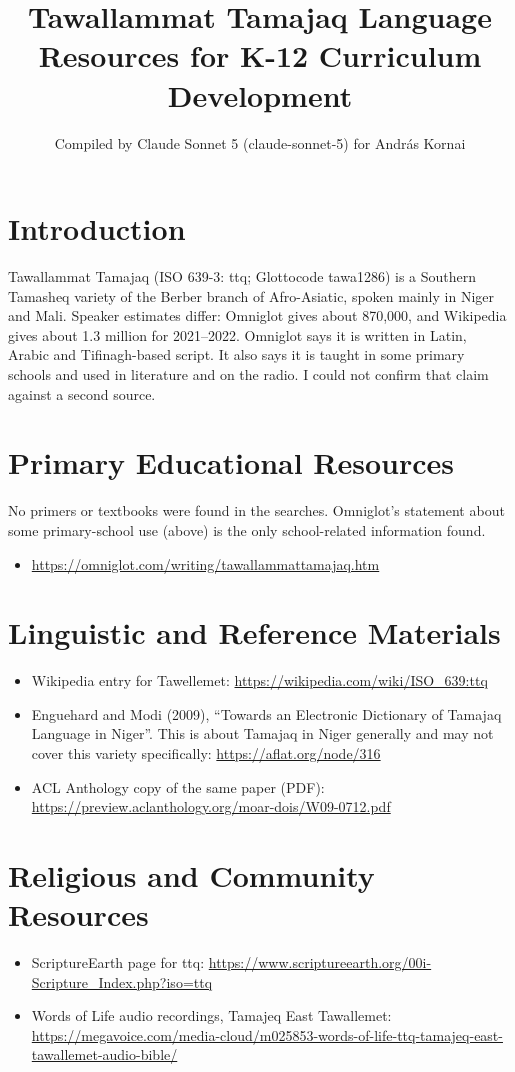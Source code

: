 \documentclass[12pt]{article}
\title{Tawallammat Tamajaq Language Resources for K-12 Curriculum Development}
\author{Compiled by Claude Sonnet 5 (claude-sonnet-5) for Andr\'as Kornai}
\date{}
\begin{document}
\maketitle

\section{Introduction}
Tawallammat Tamajaq (ISO 639-3: ttq; Glottocode tawa1286) is a Southern Tamasheq variety of the Berber branch of Afro-Asiatic, spoken mainly in Niger and Mali. Speaker estimates differ: Omniglot gives about 870,000, and Wikipedia gives about 1.3 million for 2021--2022. Omniglot says it is written in Latin, Arabic and Tifinagh-based script. It also says it is taught in some primary schools and used in literature and on the radio. I could not confirm that claim against a second source.

\section{Primary Educational Resources}
No primers or textbooks were found in the searches. Omniglot's statement about some primary-school use (above) is the only school-related information found.
\begin{itemize}
\item \url{https://omniglot.com/writing/tawallammattamajaq.htm}
\end{itemize}

\section{Linguistic and Reference Materials}
\begin{itemize}
\item Wikipedia entry for Tawellemet: \url{https://wikipedia.com/wiki/ISO_639:ttq}
\item Enguehard and Modi (2009), ``Towards an Electronic Dictionary of Tamajaq Language in Niger''. This is about Tamajaq in Niger generally and may not cover this variety specifically: \url{https://aflat.org/node/316}
\item ACL Anthology copy of the same paper (PDF): \url{https://preview.aclanthology.org/moar-dois/W09-0712.pdf}
\end{itemize}

\section{Religious and Community Resources}
\begin{itemize}
\item ScriptureEarth page for ttq: \url{https://www.scriptureearth.org/00i-Scripture_Index.php?iso=ttq}
\item Words of Life audio recordings, Tamajeq East Tawallemet: \url{https://megavoice.com/media-cloud/m025853-words-of-life-ttq-tamajeq-east-tawallemet-audio-bible/}
\end{itemize}
\end{document}
